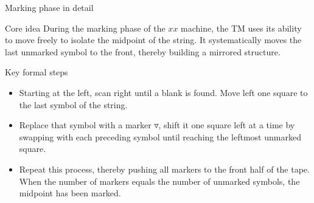 
\begin{frame}[t]{Marking phase in detail}
  \begin{tblock}{Core idea}
    During the marking phase of the $xx$ machine, the TM uses its
    ability to move freely to isolate the midpoint of the string.  It
    systematically moves the last unmarked symbol to the front,
    thereby building a mirrored structure.
  \end{tblock}
  \begin{tblock}{Key formal steps}
    \begin{itemize}
      \item Starting at the left, scan right until a blank is found.
        Move left one square to the last symbol of the string.
      \item Replace that symbol with a marker $\triangledown$, shift it
        one square left at a time by swapping with each preceding
        symbol until reaching the leftmost unmarked square.
      \item Repeat this process, thereby pushing all markers to the
        front half of the tape.  When the number of markers equals the
        number of unmarked symbols, the midpoint has been marked.
    \end{itemize}
  \end{tblock}
  \label{fr:7.2-15}
\end{frame}

